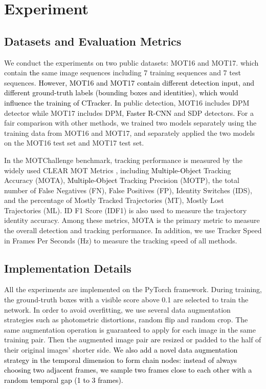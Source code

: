\documentclass[../arXiv_main.tex]{subfiles}
\newcommand\wfb[1]{\textcolor{black}{#1}}
\newcommand{\yang}[1]{\textcolor{black}{#1}}
\newcommand\CRpjl[1]{\textcolor{black}{#1}}
\newcommand{\CRyang}[1]{\textcolor{black}{#1}}
\begin{document}
\section{Experiment}
\subsection{Datasets and Evaluation Metrics}
We conduct the experiments on two public datasets: MOT16 \cite{milan2016mot16} and MOT17. which contain \wfb{the} same image sequences including 7 training sequences and 7 test sequences. \CRpjl{However, MOT16 and MOT17 contain different detection input, and different ground-truth labels (bounding boxes and identities), which would influence the training of CTracker.} \wfb{In} public detection, MOT16 includes DPM \cite{felzenszwalb2010object} detector while MOT17 includes DPM, \CRyang{Faster R-CNN} \cite{ren2015faster} and SDP \cite{yang2016exploit} detectors. For a fair comparison with other methods, we trained two models separately using the training data from MOT16 and MOT17, and separately applied the two models on the MOT16 test set and MOT17 test set.


In the MOTChallenge benchmark, tracking performance is measured by the widely used CLEAR MOT Metrics \cite{bernardin2008evaluating}, including \yang{Multiple-Object} Tracking Accuracy (MOTA), \yang{Multiple-Object} Tracking Precision (MOTP), the total number of False Negatives (FN), False Positives (FP), Identity Switches (IDS), and the percentage of Mostly Tracked Trajectories (MT), Mostly Lost Trajectories (ML). ID F1 Score (IDF1) is also used to measure the trajectory identity accuracy. Among these metrics, MOTA is the primary metric to measure the overall detection and tracking performance. In addition, we use Tracker Speed in Frames Per Seconds (Hz) to measure the tracking speed of all methods. 

\subsection{Implementation Details}
All the experiments are implemented on the PyTorch framework. During training, the ground-truth boxes with a visible score above 0.1 are selected to train the network. In order to avoid overfitting, we use several data augmentation strategies such as photometric distortions, random flip and random crop. The same augmentation operation is guaranteed to apply for each image in the same training pair. Then the augmented image pair \CRyang{are} resized or padded to the half of their original images' shorter side. \CRyang{We also add a novel data augmentation strategy in the temporal dimension to form chain nodes: instead of always choosing two adjacent frames, we sample two frames close to each other with a random temporal gap (1 to 3 frames).} 
\end{document}
